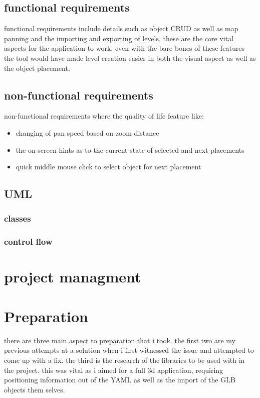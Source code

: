 \subsection{functional requirements}
functional requirements include details such as object CRUD as well as map panning and the importing and exporting of levels. these are the core vital aspects for the application to work. even with the bare bones of these features the tool would have made level creation easier in both the visual aspect as well as the object placement.

\subsection{non-functional requirements}
non-functional requirements where the quality of life feature like: 
\begin{itemize}
	\item changing of pan speed based on zoom distance
	\item the on screen hints as to the current state of selected and next placements
	\item quick middle mouse click to select object for next placement
\end{itemize}

\subsection{UML}
\subsubsection{classes}
\subsubsection{control flow}

\section{project managment}

\section{Preparation}
there are three main aspect to preparation that i took. the first two are my previous attempts at a solution when i first witnessed the issue and attempted to come up with a fix. the third is the research of the libraries to be used with in the project. this was vital as i aimed for a full 3d application, requiring positioning information out of the YAML as well as the import of the GLB objects them selves.
